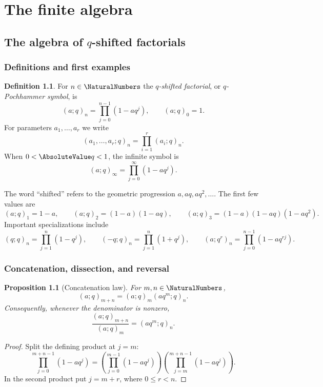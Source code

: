 \documentclass[11pt,a4paper,oneside,openany]{book}
\newtheorem{proposition}[proposition]{Proposition}
\theoremstyle{definition}
\newtheorem{definition}[definition]{Definition}
\theoremstyle{remark}
\begin{document}
\tableofcontents

\mainmatter

\part{The finite algebra}

\chapter{The algebra of \texorpdfstring{$q$}{q}-shifted factorials}\label{chap:pochhammer}

\section{Definitions and first examples}

\begin{definition}\label{qg:def-qshifted-factorial}
For $n\in\NaturalNumbers$ the \emph{$q$-shifted factorial}, or \emph{$q$-Pochhammer symbol}, is
\[
 (a;q)_n=\prod_{j=0}^{n-1}(1-aq^j),\qquad (a;q)_0=1.
\]
For parameters $a_1,\dots,a_r$ we write
\[
 (a_1,\dots,a_r;q)_n=\prod_{i=1}^r(a_i;q)_n.
\]
When $0<\AbsoluteValue q<1$, the infinite symbol is
\[
 (a;q)_\infty=\prod_{j=0}^{\infty}(1-aq^j).
\]
\end{definition}

The word ``shifted'' refers to the geometric progression $a,aq,aq^2,\ldots$.  The first few values are
\[
 (a;q)_1=1-a,
 \qquad
 (a;q)_2=(1-a)(1-aq),
 \qquad
 (a;q)_3=(1-a)(1-aq)(1-aq^2).
\]
Important specializations include
\[
 (q;q)_n=\prod_{j=1}^n(1-q^j),
 \qquad
 (-q;q)_n=\prod_{j=1}^n(1+q^j),
 \qquad
 (a;q^r)_n=\prod_{j=0}^{n-1}(1-aq^{rj}).
\]

\section{Concatenation, dissection, and reversal}

\begin{proposition}[Concatenation law]\label{prop:concat}
For $m,n\in\NaturalNumbers$,
\[
 (a;q)_{m+n}=(a;q)_m(aq^m;q)_n.
\]
Consequently, whenever the denominator is nonzero,
\[
 \frac{(a;q)_{m+n}}{(a;q)_m}=(aq^m;q)_n.
\]
\end{proposition}

\begin{proof}
Split the defining product at $j=m$:
\[
 \prod_{j=0}^{m+n-1}(1-aq^j)
 =\left(\prod_{j=0}^{m-1}(1-aq^j)\right)
  \left(\prod_{j=m}^{m+n-1}(1-aq^j)\right).
\]
In the second product put $j=m+r$, where $0\le r<n$.
\end{proof}
\end{document}
